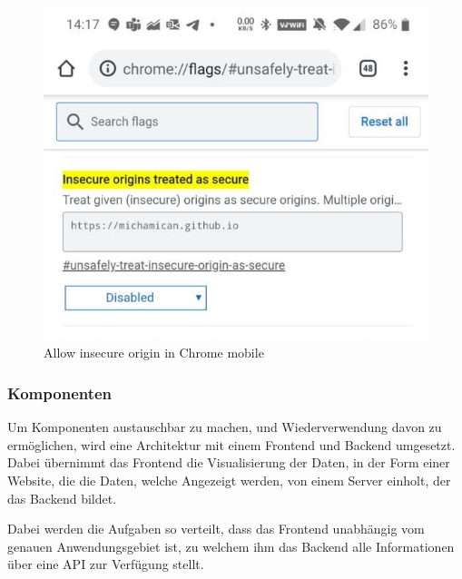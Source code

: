 \begin{figure}
	\centering
	\includegraphics[width=.75\linewidth]{images/InsecureOriginsSettings}
	\caption{Allow insecure origin in Chrome mobile}
	\label{fig:insecureOriginsSettings}
\end{figure}

%	


\subsubsection{Komponenten}
\label{section:Komponenten}

Um Komponenten austauschbar zu machen, und Wiederverwendung davon zu
ermöglichen, wird eine Architektur mit einem Frontend und Backend
umgesetzt. Dabei übernimmt das Frontend die Visualisierung der Daten,
in der Form einer Website, die die Daten, welche Angezeigt werden,
von einem Server einholt, der das Backend bildet.

Dabei werden die Aufgaben so verteilt, dass das Frontend unabhängig
vom genauen Anwendungsgebiet ist, zu welchem ihm das Backend alle
Informationen über eine API zur Verfügung stellt.

